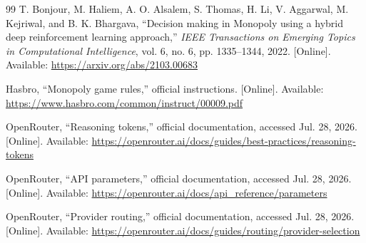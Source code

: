\documentclass[conference]{IEEEtran}
\begin{document}
\begin{thebibliography}{99}
T. Bonjour, M. Haliem, A. O. Alsalem, S. Thomas, H. Li, V. Aggarwal, M. Kejriwal, and B. K. Bhargava, ``Decision making in Monopoly using a hybrid deep reinforcement learning approach,'' \emph{IEEE Transactions on Emerging Topics in Computational Intelligence}, vol. 6, no. 6, pp. 1335--1344, 2022. [Online]. Available: \url{https://arxiv.org/abs/2103.00683}

Hasbro, ``Monopoly game rules,'' official instructions. [Online]. Available: \url{https://www.hasbro.com/common/instruct/00009.pdf}

OpenRouter, ``Reasoning tokens,'' official documentation, accessed Jul. 28, 2026. [Online]. Available: \url{https://openrouter.ai/docs/guides/best-practices/reasoning-tokens}

OpenRouter, ``API parameters,'' official documentation, accessed Jul. 28, 2026. [Online]. Available: \url{https://openrouter.ai/docs/api_reference/parameters}

OpenRouter, ``Provider routing,'' official documentation, accessed Jul. 28, 2026. [Online]. Available: \url{https://openrouter.ai/docs/guides/routing/provider-selection}

\end{thebibliography}
\endgroup
\end{document}
